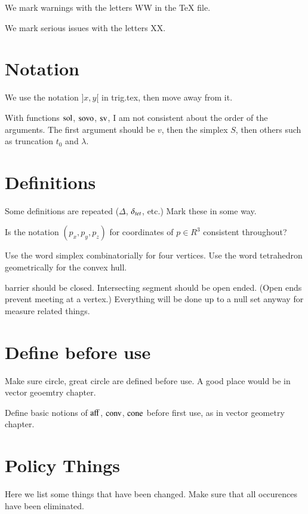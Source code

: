 

\label{XX}\label{tarski:XX}

We mark warnings with the letters WW in 
the TeX file.

We mark serious issues with the letters XX.

\section{Notation}

We use the notation $]x,y[$ in trig.tex, then move away from it.

With functions $\operatorname{sol}$, ${\operatorname{sovo}}$, ${\operatorname{sv}}$, I am not
consistent about the order of the arguments.
The first argument should be $v$, then the simplex $S$,
then others such as truncation $t_0$ and $\lambda$.


\section{Definitions}

Some definitions are repeated ($\Delta$, $\delta_{tet}$, etc.)
Mark these in some way.

Is the notation $(p_x,p_y,p_z)$ for coordinates 
of $p\in R^3$ consistent throughout?

Use the word simplex combinatorially for four vertices.
Use the word tetrahedron geometrically for the convex hull.

barrier should be closed. Intersecting segment should be open ended.
(Open ends prevent meeting at a vertex.)
Everything will be done up to a null set
anyway for measure related things.

\section{Define before use}

Make sure circle, great circle are defined before use.
A good place would be in vector geoemtry chapter.

Define basic notions of ${\operatorname{aff}}$, ${\operatorname{conv}}$, ${\operatorname{cone}}$
before first use, as in vector geometry chapter.


\section{Policy Things}

Here we list some things that have been changed.  Make sure that
all occurences have been eliminated.

